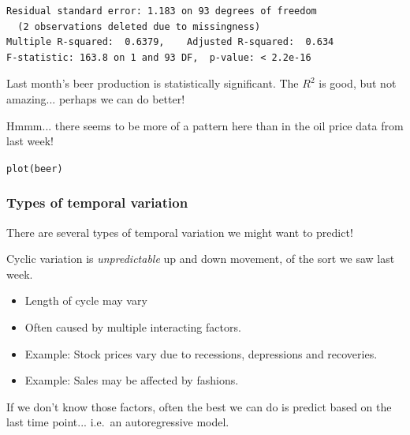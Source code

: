 \documentclass{beamer}\usepackage[]{graphicx}\usepackage[]{color}
\makeatletter
\newcommand{\hlstd}[1]{\textcolor[rgb]{1,0.894,0.769}{#1}}%
\newcommand{\hlkwd}[1]{\textcolor[rgb]{1,0.78,0.769}{#1}}%
\newenvironment{kframe}{%
 \def\at@end@of@kframe{}%
 \ifinner\ifhmode%
  \def\at@end@of@kframe{\end{minipage}}%
  \begin{minipage}{\columnwidth}%
 \fi\fi%
 \def\FrameCommand##1{\hskip\@totalleftmargin \hskip-\fboxsep
 \colorbox{shadecolor}{##1}\hskip-\fboxsep
     \hskip-\linewidth \hskip-\@totalleftmargin \hskip\columnwidth}%
 \MakeFramed {\advance\hsize-\width
   \@totalleftmargin\z@ \linewidth\hsize
   \@setminipage}}%
 {\par\unskip\endMakeFramed%
 \at@end@of@kframe}
\newenvironment{knitrout}{}{} %
\makeatother
\begin{document}
\begin{darkframes}
\begin{frame}[fragile]
\begin{knitrout}
\begin{kframe}
\begin{verbatim}
Residual standard error: 1.183 on 93 degrees of freedom
  (2 observations deleted due to missingness)
Multiple R-squared:  0.6379,	Adjusted R-squared:  0.634 
F-statistic: 163.8 on 1 and 93 DF,  p-value: < 2.2e-16
\end{verbatim}
\end{kframe}
\end{knitrout}
      
      Last month's beer production is statistically significant. The $R^2$ is good, but not amazing... perhaps we can do better!
\end{frame}

\begin{frame}[fragile]%
Hmmm... there seems to be more of a pattern here than in the oil price data from last week!
      \fontsize{9}{9}\selectfont
\begin{knitrout}
\begin{kframe}
\begin{alltt}
\hlkwd{plot}\hlstd{(beer)}
\end{alltt}
\end{kframe}


\end{knitrout}
      
\end{frame}
    \begin{frame}
\frametitle{Types of temporal variation}
There are several types of temporal variation we might want to predict!

\bigskip

Cyclic variation is \emph{unpredictable} up and down movement, of the sort we saw last week. 
\begin{itemize}
\item Length of cycle may vary
\item Often caused by multiple interacting factors.
\item Example: Stock prices vary due to recessions, depressions and recoveries.
\item Example: Sales may be affected by fashions.
\end{itemize}

\pause
If we don't know those factors, often the best we can do is predict based on the last time point... i.e.\ an autoregressive model.


\end{frame}
\end{darkframes}
\end{document}
